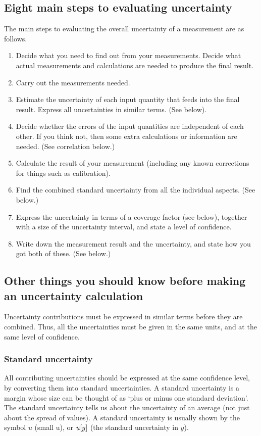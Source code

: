\subsection{Eight main steps to evaluating uncertainty}
The main steps to evaluating the overall uncertainty of a measurement are as follows.
\begin{enumerate}
\item Decide what you need to find out from your measurements. Decide what actual measurements and calculations are needed to produce the final result.
%
\item Carry out the measurements needed.
%
\item Estimate the uncertainty of each input quantity that feeds into the final result. Express all uncertainties in similar terms. (See below).
%
\item Decide whether the errors of the input quantities are independent of each other. If you think not, then some extra calculations or information are needed. (See correlation below.)
%
\item Calculate the result of your measurement (including any known corrections for things such as calibration).
%
\item Find the combined standard uncertainty from all the individual aspects. (See below.)
%
\item Express the uncertainty in terms of a coverage factor (see below), together with a size of the uncertainty interval, and state a level of confidence.
%
\item Write down the measurement result and the uncertainty, and state how you got both of these. (See below.)
\end{enumerate}


\subsection{Other things you should know before making an uncertainty calculation}
Uncertainty contributions must be expressed in similar terms before they are combined. Thus, all the uncertainties must be given in the same units, and at the same level of confidence.


\subsubsection{Standard uncertainty}
All contributing uncertainties should be expressed at the same confidence level, by converting them into standard uncertainties. A standard uncertainty is a margin whose size can be thought of as `plus or minus one standard deviation'. The standard uncertainty tells us about the uncertainty of an average (not just about the spread of values). A standard uncertainty is usually shown by the symbol $u$ (small u), or $u\!\left[{y}\right]$ (the standard uncertainty in $y$).

